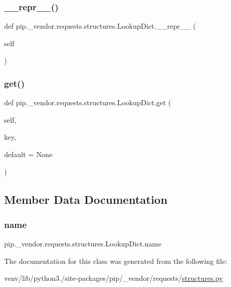\subsubsection{\texorpdfstring{\+\_\+\+\_\+repr\+\_\+\+\_\+()}{\_\_repr\_\_()}}
{\footnotesize\ttfamily def pip.\+\_\+vendor.\+requests.\+structures.\+Lookup\+Dict.\+\_\+\+\_\+repr\+\_\+\+\_\+ (\begin{DoxyParamCaption}\item[{}]{self }\end{DoxyParamCaption})}

\mbox{\label{classpip_1_1__vendor_1_1requests_1_1structures_1_1LookupDict_aefa5cb718796e979a5b682650a777897}} 
\subsubsection{\texorpdfstring{get()}{get()}}
{\footnotesize\ttfamily def pip.\+\_\+vendor.\+requests.\+structures.\+Lookup\+Dict.\+get (\begin{DoxyParamCaption}\item[{}]{self,  }\item[{}]{key,  }\item[{}]{default = {\ttfamily None} }\end{DoxyParamCaption})}



\subsection{Member Data Documentation}
\mbox{\label{classpip_1_1__vendor_1_1requests_1_1structures_1_1LookupDict_a7ca3c1a94915e595049a0e1673041848}} 
\subsubsection{\texorpdfstring{name}{name}}
{\footnotesize\ttfamily pip.\+\_\+vendor.\+requests.\+structures.\+Lookup\+Dict.\+name}



The documentation for this class was generated from the following file\+:\begin{DoxyCompactItemize}
\item 
venv/lib/python3./site-\/packages/pip/\+\_\+vendor/requests/\hyperlink{structures_8py}{structures.\+py}\end{DoxyCompactItemize}
